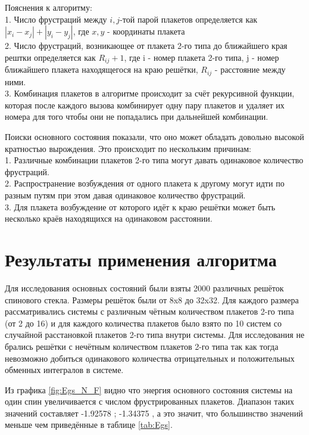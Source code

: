 \documentclass[utf8, babel, sor, jor, amsmath, amssymb, reprint]{elsarticle} %
\begin{document}
Пояснения к алгоритму:\\
1. Число фрустраций между $i,j$-той парой плакетов определяется как $\left|x_i-x_j\right|+\left|y_i-y_j\right|$, где $x, y$ - координаты плакета\\
2. Число фрустраций, возникающее от плакета 2-го типа до ближайшего края рештки определяется как $R_{ij}+1$, где i - номер плакета 2-го типа, j - номер ближайшего плакета находящегося на краю решётки, $R_{ij}$ - расстояние между ними.\\
3. Комбинация плакетов в алгоритме происходит за счёт рекурсивной функции, которая после каждого вызова комбинирует одну пару плакетов и удаляет их номера для того чтобы они не попадались при дальнейшей комбинации. 

Поиски основного состояния показали, что оно может обладать довольно высокой кратностью вырождения. Это происходит по нескольким причинам:\\
1. Различные комбинации плакетов 2-го типа могут давать одинаковое количество фрустраций.\\
2. Распространение возбуждения от одного плакета к другому могут идти по разным путям при этом давая одинаковое количество фрустраций.\\
3. Для плакета возбуждение от которого идёт к краю решётки может быть несколько краёв находящихся на одинаковом расстоянии.\\

\section{Результаты применения алгоритма}
Для исследования основных состояний были взяты 2000 различных решёток спинового стекла.
Размеры решёток были от 8x8 до 32x32. Для каждого размера рассматривались системы с различным чётным количеством плакетов 2-го типа (от 2 до 16) и для каждого количества плакетов было взято по 10 систем со случайной расстановкой плакетов 2-го типа внутри системы. Для исследования не  брались решётки с нечётным количеством плакетов 2-го типа так как тогда невозможно добиться одинакового количества отрицательных и положительных обменных интегралов в системе. 

Из графика \ref{fig:Egs_N_F} видно что энергия основного состояния системы на один спин увеличивается с числом фрустрированных плакетов. Диапазон таких значений составляет -1.92578 ; -1.34375 , а это значит, что большинство значений меньше чем приведённые в таблице \ref{tab:Egs}. 
\end{document}
